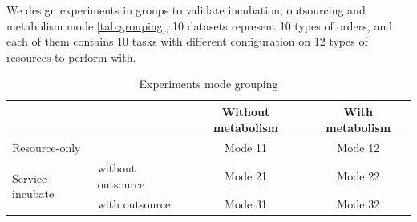 We design experiments in groups to validate incubation, outsourcing and metabolism mode \autoref{tab:grouping}, 10 datasets represent 10 types of orders, and each of them contains 10 tasks with different configuration on 12 types of resources to perform with. 

\begin{table}[htbp]
  \centering
  \scriptsize
  \caption{Experiments mode grouping}
    \begin{tabular}{llcc}
    \toprule
          &       & Without metabolism & With metabolism \\
    \midrule
    \multicolumn{2}{l}{Resource-only} & Mode 11 & Mode 12 \\\hline
    \multicolumn{1}{l}{\multirow{2}[0]{*}{Service-incubate}} & without outsource & Mode 21 &Mode 22 \\\cline{2-4}
    \multicolumn{1}{l}{} & with outsource & Mode 31 & Mode 32 \\
    \bottomrule
    \end{tabular}%
  \label{tab:grouping}%
\end{table}%

